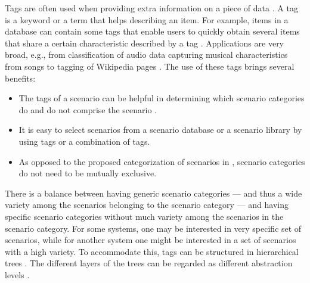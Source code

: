 \documentclass[twoside,twocolumn,9pt]{extarticle}
\theoremstyle{plain}
\begin{document}
Tags are often used when providing extra information on a piece of data \autocite{smith2007tagging}. A tag is a keyword or a term that helps describing an item. For example, items in a database can contain some tags that enable users to quickly obtain several items that share a certain characteristic described by a tag \autocite{craft2004tagging}. 
Applications are very broad, e.g., from classification of audio data \autocite{kong2017joint} capturing musical characteristics from songs \autocite{ellis2011semantic} to tagging of Wikipedia pages \autocite{voss2006collaborative}.
The use of these tags brings several benefits:
\begin{itemize}
	\item The tags of a scenario can be helpful in determining which scenario categories do and do not comprise the scenario \autocite{degelder2020scenariomining}.
	\item It is easy to select scenarios from a scenario database or a scenario library by using tags or a combination of tags.
	\item As opposed to the proposed categorization of scenarios in \autocite{opdencamp2014cats, USDoT2007precrashscenarios, lenard2014typical, lara2019harmonized, lara2019harmonized}, scenario categories do not need to be mutually exclusive.
\end{itemize}

There is a balance between having generic scenario categories --- and thus a wide variety among the scenarios belonging to the scenario category --- and having specific scenario categories without much variety among the scenarios in the scenario category. For some systems, one may be interested in very specific set of scenarios, while for another system one might be interested in a set of scenarios with a high variety. To accommodate this, tags can be structured in hierarchical trees \autocite{molloy2017dynamic}. The different layers of the trees can be regarded as different abstraction levels \autocite{Bonnin2014}. 
\end{document}
